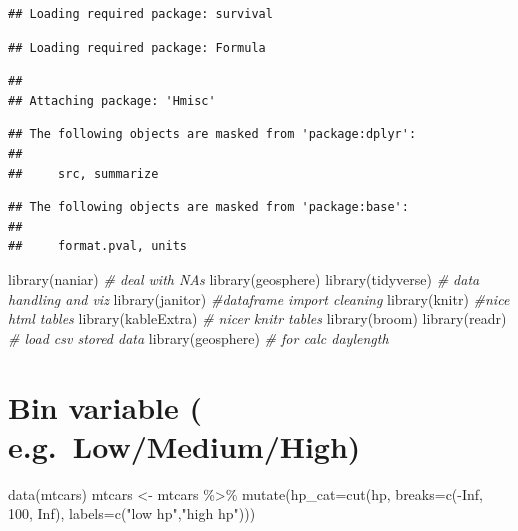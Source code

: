 \documentclass[
]{book}
\newenvironment{Shaded}{\begin{snugshade}}{\end{snugshade}}
\newcommand{\AttributeTok}[1]{\textcolor[rgb]{0.77,0.63,0.00}{#1}}
\newcommand{\CommentTok}[1]{\textcolor[rgb]{0.56,0.35,0.01}{\textit{#1}}}
\newcommand{\ConstantTok}[1]{\textcolor[rgb]{0.00,0.00,0.00}{#1}}
\newcommand{\DecValTok}[1]{\textcolor[rgb]{0.00,0.00,0.81}{#1}}
\newcommand{\FunctionTok}[1]{\textcolor[rgb]{0.00,0.00,0.00}{#1}}
\newcommand{\NormalTok}[1]{#1}
\newcommand{\OtherTok}[1]{\textcolor[rgb]{0.56,0.35,0.01}{#1}}
\newcommand{\SpecialCharTok}[1]{\textcolor[rgb]{0.00,0.00,0.00}{#1}}
\newcommand{\StringTok}[1]{\textcolor[rgb]{0.31,0.60,0.02}{#1}}
\begin{document}
\begin{verbatim}
## Loading required package: survival
\end{verbatim}

\begin{verbatim}
## Loading required package: Formula
\end{verbatim}

\begin{verbatim}
## 
## Attaching package: 'Hmisc'
\end{verbatim}

\begin{verbatim}
## The following objects are masked from 'package:dplyr':
## 
##     src, summarize
\end{verbatim}

\begin{verbatim}
## The following objects are masked from 'package:base':
## 
##     format.pval, units
\end{verbatim}

\begin{Shaded}
\begin{Highlighting}[]
\FunctionTok{library}\NormalTok{(naniar) }\CommentTok{\# deal with NAs}
\FunctionTok{library}\NormalTok{(geosphere)}
\FunctionTok{library}\NormalTok{(tidyverse) }\CommentTok{\# data handling and viz}
\FunctionTok{library}\NormalTok{(janitor) }\CommentTok{\#dataframe import cleaning}
\FunctionTok{library}\NormalTok{(knitr) }\CommentTok{\#nice html tables}
\FunctionTok{library}\NormalTok{(kableExtra) }\CommentTok{\# nicer knitr tables}
\FunctionTok{library}\NormalTok{(broom)}
\FunctionTok{library}\NormalTok{(readr) }\CommentTok{\# load csv stored data}
\FunctionTok{library}\NormalTok{(geosphere) }\CommentTok{\# for calc daylength}
\end{Highlighting}
\end{Shaded}

\hypertarget{bin-variable-e.g.-lowmediumhigh}{%
\section{Bin variable ( e.g.~Low/Medium/High)}\label{bin-variable-e.g.-lowmediumhigh}}

\begin{Shaded}
\begin{Highlighting}[]
\FunctionTok{data}\NormalTok{(mtcars)}
\NormalTok{mtcars }\OtherTok{\textless{}{-}}\NormalTok{ mtcars }\SpecialCharTok{\%\textgreater{}\%} \FunctionTok{mutate}\NormalTok{(}\AttributeTok{hp\_cat=}\FunctionTok{cut}\NormalTok{(hp, }\AttributeTok{breaks=}\FunctionTok{c}\NormalTok{(}\SpecialCharTok{{-}}\ConstantTok{Inf}\NormalTok{, }\DecValTok{100}\NormalTok{, }\ConstantTok{Inf}\NormalTok{), }
                                       \AttributeTok{labels=}\FunctionTok{c}\NormalTok{(}\StringTok{"low hp"}\NormalTok{,}\StringTok{"high hp"}\NormalTok{)))}
\end{Highlighting}
\end{Shaded}
\end{document}
